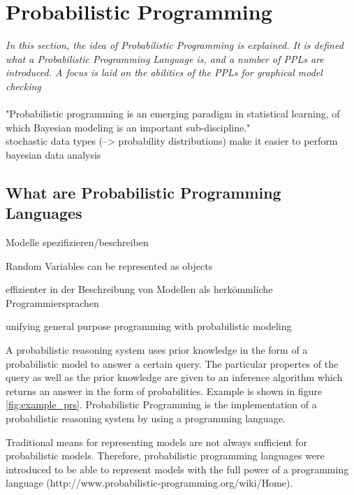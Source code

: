 \documentclass{article}
\begin{document}
\section{Probabilistic Programming}

\textit{In this section,  the idea of Probabilistic Programming is explained. It is defined what a Probabilistic Programming Language is, and a number of PPLs are introduced. A focus is laid on the abilities of the PPLs for graphical model checking}
\\
\\
"Probabilistic programming is an emerging paradigm in statistical learning, of which Bayesian modeling is an important sub-discipline." \cite{Salvatier2016}
\\
stochastic data types (--> probability distributions) make it easier to perform bayesian data analysis

\subsection{What are Probabilistic Programming Languages}

Modelle spezifizieren/beschreiben 

Random Variables can be represented as objects

\cite{wiki:Probabilisticprogramminglanguage}

effizienter in der Beschreibung von Modellen als herkömmliche Programmiersprachen \cite{Hardesty2015}

unifying general purpose programming with probabilistic modeling \cite{probabilistic-programming.org}


A \gls{probabilistic reasoning system} uses prior knowledge in the form of a \gls{probabilistic model} to answer a certain query. The particular propertes of the query as well as the prior knowledge are given to an \gls{inference algorithm} which returns an answer in the form of probabilities. Example is shown in figure \ref{fig:example_prs}. Probabilistic Programming is the implementation of a \gls{probabilistic reasoning system} by using a programming language.

Traditional means for representing models are not always sufficient for probabilistic models. Therefore, probabilistic programming languages were introduced to be able to represent models with the full power of a programming language (http://www.probabilistic-programming.org/wiki/Home).
\end{document}

